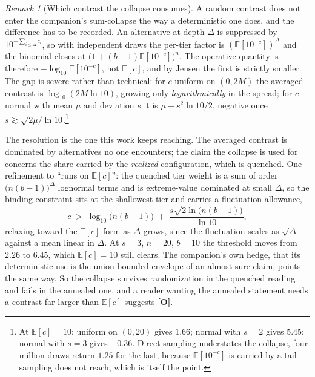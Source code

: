 \documentclass[11pt]{article}
\numberwithin{equation}{section}
\theoremstyle{plain}
\theoremstyle{definition}
\theoremstyle{remark}
\newtheorem{remark}[theorem]{Remark}
\newcommand{\E}{\mathbb{E}}
\begin{document}
\begin{remark}[Which contrast the collapse consumes]\label{sch:rem:n2}
A random contrast does not enter the companion's sum-collapse the way a
deterministic one does, and the difference has to be recorded. An alternative at depth $\Delta$ is suppressed by
$10^{-\sum_{i\le\Delta}c_i}$, so with independent draws the per-tier
factor is $(\E[10^{-c}])^{\Delta}$ and the binomial closes at
$\bigl(1+(b-1)\E[10^{-c}]\bigr)^{n}$. The operative quantity is
therefore $-\log_{10}\E[10^{-c}]$, not $\E[c]$, and by Jensen the first
is strictly smaller. The gap is severe rather than technical: for $c$
uniform on $(0,2M)$ the averaged contrast is $\log_{10}(2M\ln10)$,
growing only \emph{logarithmically} in the spread; for $c$ normal with
mean $\mu$ and deviation $s$ it is $\mu-s^{2}\ln10/2$, negative once
$s\gtrsim\sqrt{2\mu/\ln10}$.\footnote{At $\E[c]=10$: uniform on
$(0,20)$ gives $1.66$; normal with $s=2$ gives $5.45$; normal with $s=3$
gives $-0.36$. Direct sampling understates the collapse, four million
draws return $1.25$ for the last, because $\E[10^{-c}]$ is carried by
a tail sampling does not reach, which is itself the point.}

The resolution is the one this work keeps reaching. The averaged
contrast is dominated by alternatives no one encounters; the claim the
collapse is used for concerns the share carried by the \emph{realized}
configuration, which is quenched. One refinement to ``runs on $\E[c]$'':
the quenched tier weight is a sum of order $\bigl(n(b-1)\bigr)^{\Delta}$
lognormal terms and is extreme-value dominated at small $\Delta$, so the
binding constraint sits at the shallowest tier and carries a fluctuation
allowance,
\begin{equation}\label{sch:eq:quenchedcrit}
\bar c\;>\;\log_{10}\bigl(n(b-1)\bigr)
\;+\;\frac{s\sqrt{2\ln\bigl(n(b-1)\bigr)}}{\ln10},
\end{equation}
relaxing toward the $\E[c]$ form as $\Delta$ grows, since the fluctuation
scales as $\sqrt\Delta$ against a mean linear in $\Delta$. At $s=3$,
$n=20$, $b=10$ the threshold moves from $2.26$ to $6.45$, which
$\E[c]=10$ still clears. The companion's
own hedge, that its deterministic use is the union-bounded envelope
of an almost-sure claim, points the same way. So the collapse
survives randomization in the quenched reading and fails in the annealed
one, and a reader wanting the annealed statement needs a contrast far
larger than $\E[c]$ suggests \textbf{[O]}.
\end{remark}
\end{document}
